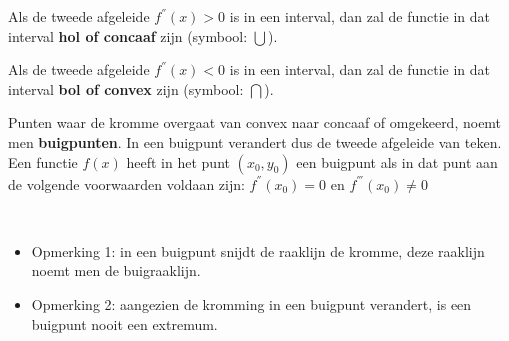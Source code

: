 \begin{definitie}
	Als de tweede afgeleide $f^{''}(x)>0$ is in een interval,
dan zal de functie in dat interval \textbf{hol of concaaf} zijn (symbool:
$\bigcup$).

Als de tweede afgeleide $f^{''}(x)<0$ is in een interval,
dan zal de functie in dat interval \textbf{bol of convex} zijn (symbool:
$\bigcap$).

Punten waar de kromme overgaat van convex naar concaaf of
omgekeerd, noemt men \textbf{buigpunten}. In een buigpunt verandert
dus de tweede afgeleide van teken. Een functie $f(x)$ heeft in het
punt $(x_{0},y_{0})$ een buigpunt als in dat punt aan de volgende
voorwaarden voldaan zijn: $f^{''}(x_{0})=0$ en $f^{'''}(x_{0})\neq0$

\end{definitie}


\begin{opmerking}
	\ \\
	\begin{itemize}
	\item Opmerking 1: in een buigpunt snijdt de raaklijn de kromme,
	deze raaklijn noemt men de buigraaklijn.
	
	\item Opmerking 2: aangezien de kromming in een buigpunt verandert,
	is een buigpunt nooit een extremum.
\end{itemize}

\end{opmerking}


